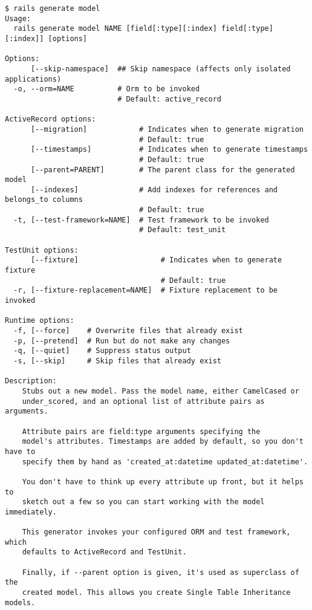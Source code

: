 \documentclass[a4paper]{book}
\begin{document}
\begin{shaded}\begin{verbatim}
$ rails generate model
Usage:
  rails generate model NAME [field[:type][:index] field[:type][:index]] [options]

Options:
      [--skip-namespace]  ## Skip namespace (affects only isolated applications)
  -o, --orm=NAME          # Orm to be invoked
                          # Default: active_record

ActiveRecord options:
      [--migration]            # Indicates when to generate migration
                               # Default: true
      [--timestamps]           # Indicates when to generate timestamps
                               # Default: true
      [--parent=PARENT]        # The parent class for the generated model
      [--indexes]              # Add indexes for references and belongs_to columns
                               # Default: true
  -t, [--test-framework=NAME]  # Test framework to be invoked
                               # Default: test_unit

TestUnit options:
      [--fixture]                   # Indicates when to generate fixture
                                    # Default: true
  -r, [--fixture-replacement=NAME]  # Fixture replacement to be invoked

Runtime options:
  -f, [--force]    # Overwrite files that already exist
  -p, [--pretend]  # Run but do not make any changes
  -q, [--quiet]    # Suppress status output
  -s, [--skip]     # Skip files that already exist

Description:
    Stubs out a new model. Pass the model name, either CamelCased or
    under_scored, and an optional list of attribute pairs as arguments.

    Attribute pairs are field:type arguments specifying the
    model's attributes. Timestamps are added by default, so you don't have to
    specify them by hand as 'created_at:datetime updated_at:datetime'.

    You don't have to think up every attribute up front, but it helps to
    sketch out a few so you can start working with the model immediately.

    This generator invokes your configured ORM and test framework, which
    defaults to ActiveRecord and TestUnit.

    Finally, if --parent option is given, it's used as superclass of the
    created model. This allows you create Single Table Inheritance models.


\end{verbatim}
\end{shaded}
\end{document}
